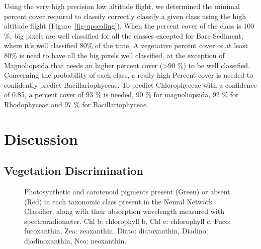 \documentclass[
  number]{elsarticle}
\begin{document}
Using the very high precision low altitude flight, we determined the
minimal percent cover required to classify correctly classify a given
class using the high altitude flight (Figure~\ref{fig-upscaling}). When
the percent cover of the class is 100 \%, big pixels are well classified
for all the classes excepted for Bare Sediment, where it's well
classified 80\% of the time. A vegetative percent cover of at least 80\%
is need to have all the big pixels well classified, at the exception of
Magnoliopsida that needs an higher percent cover (\textgreater90 \%) to
be well classified. Concerning the probability of each class, a really
high Percent cover is needed to confidently predict Bacillariophyceae.
To predict Chlorophyceae with a confidence of 0.85, a percent cover of
93 \% is needed, 90 \% for magnoliopsida, 92 \% for Rhodophyceae and 97
\% for Bacillariophyceae.

\section{Discussion}\label{discussion}

\subsection{Vegetation Discrimination}\label{vegetation-discrimination}

\label{cell-fig-Pigm}
\begin{figure}[H]


\caption{\label{fig-Pigm}Photosynthetic and carotenoid pigments present
(Green) or absent (Red) in each taxonomic class present in the Neural
Network Classifier, along with their absorption wavelength measured with
spectroradiometer. Chl b: chlorophyll b, Chl c: chlorophyll c, Fuco:
fucoxanthin, Zea: zeaxanthin, Diato: diatoxanthin, Diadino:
diadinoxanthin, Neo: neoxanthin.}

\end{figure}%
\end{document}
